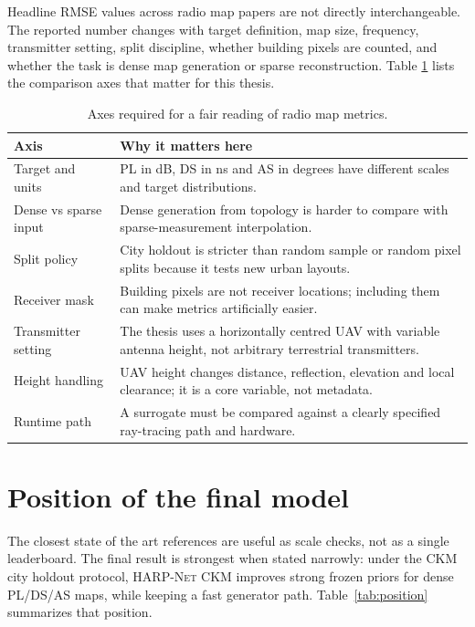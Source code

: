 Headline RMSE values across radio map papers are not directly interchangeable.
The reported number changes with target definition, map size, frequency,
transmitter setting, split discipline, whether building pixels are counted, and
whether the task is dense map generation or sparse reconstruction. Table
\ref{tab:fairness} lists the comparison axes that matter for this thesis.

\begin{table}[htbp]
\centering
\caption{Axes required for a fair reading of radio map metrics.}
\label{tab:fairness}
\scriptsize
\setlength{\tabcolsep}{3pt}
\begin{tabularx}{\textwidth}{p{}X}
\toprule
Axis & Why it matters here \\
\midrule
Target and units & PL in dB, DS in ns and AS in degrees have different scales and target distributions. \\
Dense vs sparse input & Dense generation from topology is harder to compare with sparse-measurement interpolation. \\
Split policy & City holdout is stricter than random sample or random pixel splits because it tests new urban layouts. \\
Receiver mask & Building pixels are not receiver locations; including them can make metrics artificially easier. \\
Transmitter setting & The thesis uses a horizontally centred UAV with variable antenna height, not arbitrary terrestrial transmitters. \\
Height handling & UAV height changes distance, reflection, elevation and local clearance; it is a core variable, not metadata. \\
Runtime path & A surrogate must be compared against a clearly specified ray-tracing path and hardware. \\
\bottomrule
\end{tabularx}
\end{table}

\section{Position of the final model}
\label{sec:soa_position}

The closest state of the art references are useful as scale checks, not as a
single leaderboard. The final result is strongest when stated narrowly: under
the CKM city holdout protocol, \textsc{HARP-Net CKM} improves
strong frozen priors for dense PL/DS/AS maps, while keeping a fast generator
path. Table~\ref{tab:position} summarizes that position.

